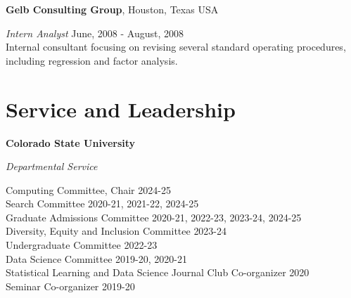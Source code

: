 \documentclass[margin,line]{res}
\begin{document}
\begin{resume}
{\bf Gelb Consulting Group}, Houston, Texas USA

\vspace{-.3cm}
{\em Intern Analyst} \hfill {June, 2008 - August, 2008}\\
Internal consultant focusing on revising several standard operating procedures, including regression and factor analysis. 

\section{\sc Service and Leadership}

{\bf Colorado State University}

\vspace{-.3cm}
{\em Departmental Service}

\vspace{-.3cm}
Computing Committee, Chair \hfill {2024-25} \\
Search Committee \hfill {2020-21, 2021-22, 2024-25} \\
Graduate Admissions Committee \hfill {2020-21, 2022-23, 2023-24, 2024-25} \\
Diversity, Equity and Inclusion Committee \hfill {2023-24} \\
Undergraduate Committee \hfill {2022-23} \\
Data Science Committee \hfill {2019-20, 2020-21} \\
Statistical Learning and Data Science Journal Club Co-organizer \hfill {2020} \\
Seminar Co-organizer \hfill {2019-20} \\


\end{resume}
\end{document}
